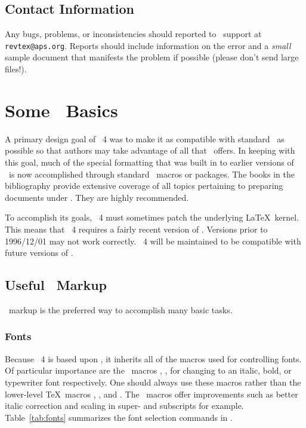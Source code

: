 \documentclass[%
 ,twocolumn%
 ,secnumarabic%
,amssymb, amsmath,nobibnotes, aps, prl]{revtex4}
\begin{document}
\subsection{Contact Information}\label{sec:resources}%
Any bugs, problems, or inconsistencies should reported to
\revtex\ support at \verb+revtex@aps.org+.
Reports should include information on the error and a \textit{small}
sample document that manifests the problem if possible (please don't
send large files!).

\section{Some \LaTeXe\ Basics}
A primary design goal of \revtex~4 was to make it as compatible with
standard \LaTeXe\ as possible so that authors may take advantage of all
that \LaTeXe\ offers. In keeping with this goal, much of the special
formatting that was built in to earlier versions of \revtex\ is now
accomplished through standard \LaTeXe\ macros or packages. The books
in the bibliography provide extensive coverage of all topics
pertaining to preparing documents under \LaTeXe. They are highly recommended.

To accomplish its goals, \revtex~4 must sometimes patch the underlying
\LaTeX\ kernel. This means that \revtex~4 requires a fairly recent version of
\LaTeXe. Versions prior to 1996/12/01 may not work
correctly. \revtex~4 will be maintained to be compatible with future
versions of \LaTeXe.

\subsection{Useful \LaTeXe\ Markup}
\LaTeXe\ markup is the preferred way to accomplish many basic tasks.

\subsubsection{Fonts}

Because \revtex~4 is based upon \LaTeXe, it inherits all of the
macros used for controlling fonts. Of particular importance are the
\LaTeXe\ macros \cmd{\textit}, \cmd{\textbf}, \cmd{\texttt} for changing to
an italic, bold, or typewriter font respectively. One should always
use these macros rather than the lower-level \TeX\ macros \cmd{\it},
\cmd{\bf}, and \cmd{\tt}. The \LaTeXe\ macros offer
improvements such as better italic correction and scaling in super-
and subscripts for example. Table~\ref{tab:fonts}
summarizes the font selection commands in \LaTeXe.
\end{document}
